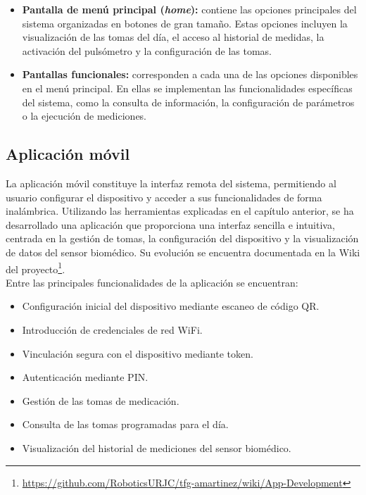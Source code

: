 \begin{itemize}
    \item \textbf{Pantalla de menú principal (\textit{home}):} contiene las opciones principales del sistema organizadas en botones de gran tamaño. Estas opciones incluyen la visualización de las tomas del día, el acceso al historial de medidas, la activación del pulsómetro y la configuración de las tomas.

    \item \textbf{Pantallas funcionales:} corresponden a cada una de las opciones disponibles en el menú principal. En ellas se implementan las funcionalidades específicas del sistema, como la consulta de información, la configuración de parámetros o la ejecución de mediciones.

\end{itemize}

\subsection{Aplicación móvil}
\label{sec:app_movil}

La aplicación móvil constituye la interfaz remota del sistema, permitiendo al usuario configurar el dispositivo y acceder a sus funcionalidades de forma inalámbrica. Utilizando las herramientas explicadas en el capítulo anterior, se ha desarrollado una aplicación que proporciona una interfaz sencilla e intuitiva, centrada en la gestión de tomas, la configuración del dispositivo y la visualización de datos del sensor biomédico. Su evolución se encuentra documentada en la Wiki del proyecto\footnote{\url{https://github.com/RoboticsURJC/tfg-amartinez/wiki/App-Development}}.\\

Entre las principales funcionalidades de la aplicación se encuentran:

\begin{itemize}
    \item Configuración inicial del dispositivo mediante escaneo de código QR.
    \item Introducción de credenciales de red WiFi.
    \item Vinculación segura con el dispositivo mediante token.
    \item Autenticación mediante PIN.
    \item Gestión de las tomas de medicación.
    \item Consulta de las tomas programadas para el día.
    \item Visualización del historial de mediciones del sensor biomédico.
\end{itemize}

